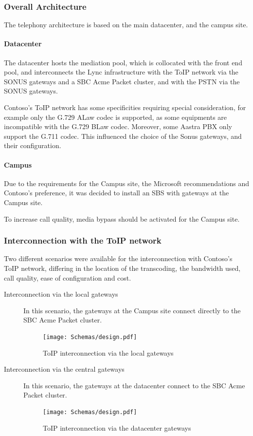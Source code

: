 \subsubsection{Overall Architecture}
	The telephony architecture is based on the main datacenter, and the campus site.

	\paragraph{Datacenter}
	The datacenter hosts the mediation pool, which is collocated with the front end pool, and interconnects the Lync infrastructure with the ToIP network via the SONUS gateways and a SBC Acme Packet cluster, and with the PSTN via the SONUS gateways.
	
	Contoso's ToIP network has some specificities requiring special consideration, for example only the G.729 ALaw codec is supported, as some equipments are incompatible with the G.729 BLaw codec. Moreover, some Aastra PBX only support the G.711 codec. This influenced the choice of the Sonus gateways, and their configuration.
	

	\paragraph{Campus}
	Due to the requirements for the Campus site, the Microsoft recommendations and Contoso's preference, it was decided to install an SBS with gateways at the Campus site.
	
	To increase call quality, media bypass should be activated for the Campus site.


\subsubsection{Interconnection with the ToIP network}
	Two different scenarios were available for the interconnection with Contoso's ToIP network, differing in the location of the transcoding, the bandwidth used, call quality, ease of configuration and cost.
	\begin{description}
		\item[Interconnection via the local gateways] 
			In this scenario, the gateways at the Campus site connect directly to the SBC Acme Packet cluster.
			\begin{figure}[H]
				\centering
				\texttt{[image: Schemas/design.pdf]}
				\caption{ToIP interconnection via the local gateways}
				\label{fig:case_toip_local}
			\end{figure}
		\item[Interconnection via the central gateways] 
			In this scenario, the gateways at the datacenter connect to the SBC Acme Packet cluster.
			\begin{figure}[H]
				\centering
				\texttt{[image: Schemas/design.pdf]}
				\caption{ToIP interconnection via the datacenter gateways}
				\label{fig:case_toip_datacenter}
			\end{figure}
	\end{description}
	
